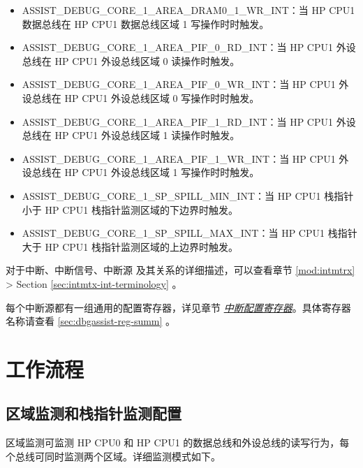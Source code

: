 \documentclass[main\_\_CN.tex]{subfiles}
\begin{document}
\begin{itemize}
\item \label{int:ASSISTDEBUGCORE1AREADRAM01WRINT}ASSIST\_DEBUG\_CORE\_1\_AREA\_DRAM0\_1\_WR\_INT：当 HP CPU1 数据总线在 HP CPU1 数据总线区域 1 写操作时时触发。
\item \label{int:ASSISTDEBUGCORE1AREAPIF0RDINT}ASSIST\_DEBUG\_CORE\_1\_AREA\_PIF\_0\_RD\_INT：当 HP CPU1 外设总线在 HP CPU1 外设总线区域 0 读操作时触发。
\item \label{int:ASSISTDEBUGCORE1AREAPIF0WRINT}ASSIST\_DEBUG\_CORE\_1\_AREA\_PIF\_0\_WR\_INT：当 HP CPU1 外设总线在 HP CPU1 外设总线区域 0 写操作时时触发。
\item \label{int:ASSISTDEBUGCORE1AREAPIF1RDINT}ASSIST\_DEBUG\_CORE\_1\_AREA\_PIF\_1\_RD\_INT：当 HP CPU1 外设总线在 HP CPU1 外设总线区域 1 读操作时触发。
\item \label{int:ASSISTDEBUGCORE1AREAPIF1WRINT}ASSIST\_DEBUG\_CORE\_1\_AREA\_PIF\_1\_WR\_INT：当 HP CPU1 外设总线在 HP CPU1 外设总线区域 1 写操作时时触发。
\item
\label{int:ASSISTDEBUGCORE1SPSPILLMININT}ASSIST\_DEBUG\_CORE\_1\_SP\_SPILL\_MIN\_INT：当 HP CPU1 栈指针小于 HP CPU1 栈指针监测区域的下边界时触发。
\item
\label{int:ASSISTDEBUGCORE1SPSPILLMAXINT}ASSIST\_DEBUG\_CORE\_1\_SP\_SPILL\_MAX\_INT：当 HP CPU1 栈指针大于 HP CPU1 栈指针监测区域的上边界时触发。
\end{itemize}

\begin{tiplisting}
对于中断、中断信号、中断源 及其关系的详细描述，可以查看章节 \ref{mod:intmtrx} \textit{} > Section \ref{sec:intmtx-int-terminology} \textit{}。
\end{tiplisting}

每个中断源都有一组通用的配置寄存器，详见章节 \hyperref[interrupt-config-registers]{\textit{中断配置寄存器}}。具体寄存器名称请查看 \ref{sec:dbgassist-reg-summ} \textit{}。


\section{工作流程}
\label{sec:dbgassist-recommended-operation}

\subsection{区域监测和栈指针监测配置}

区域监测可监测 HP CPU0 和 HP CPU1 的数据总线和外设总线的读写行为，每个总线可同时监测两个区域。详细监测模式如下。
\end{document}
